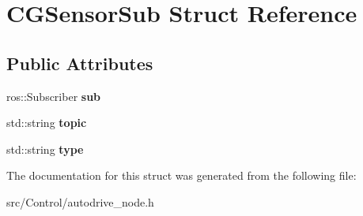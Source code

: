 \hypertarget{structCGSensorSub}{}\section{C\+G\+Sensor\+Sub Struct Reference}
\label{structCGSensorSub}
\subsection*{Public Attributes}
\begin{DoxyCompactItemize}
\item 
\mbox{\label{structCGSensorSub_a2c17aa1bb2524589c279a473bcb8f3e4}} 
ros\+::\+Subscriber {\bfseries sub}
\item 
\mbox{\label{structCGSensorSub_a1eae46e67399b39351d827a47128f031}} 
std\+::string {\bfseries topic}
\item 
\mbox{\label{structCGSensorSub_a78169faeb0824450f39afc4b3a48659e}} 
std\+::string {\bfseries type}
\end{DoxyCompactItemize}


The documentation for this struct was generated from the following file\+:\begin{DoxyCompactItemize}
\item 
src/\+Control/autodrive\+\_\+node.\+h\end{DoxyCompactItemize}
